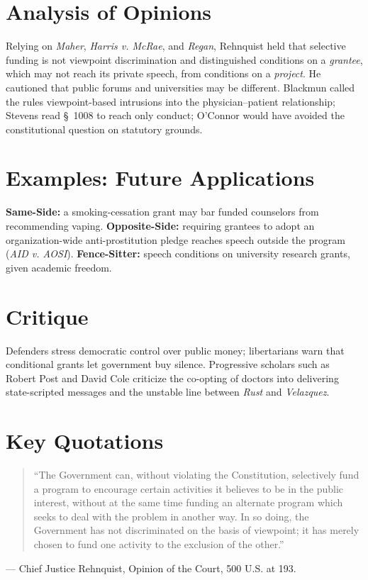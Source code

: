\documentclass[12pt]{article}
\begin{document}
\section{Analysis of Opinions}
Relying on \textit{Maher}, \textit{Harris v. McRae}, and \textit{Regan}, Rehnquist held that selective funding is not viewpoint discrimination and distinguished conditions on a \textit{grantee}, which may not reach its private speech, from conditions on a \textit{project}. He cautioned that public forums and universities may be different. Blackmun called the rules viewpoint-based intrusions into the physician--patient relationship; Stevens read \S~1008 to reach only conduct; O'Connor would have avoided the constitutional question on statutory grounds.

\section{Examples: Future Applications}
\textbf{Same-Side:} a smoking-cessation grant may bar funded counselors from recommending vaping. \textbf{Opposite-Side:} requiring grantees to adopt an organization-wide anti-prostitution pledge reaches speech outside the program (\textit{AID v. AOSI}). \textbf{Fence-Sitter:} speech conditions on university research grants, given academic freedom.

\section{Critique}
Defenders stress democratic control over public money; libertarians warn that conditional grants let government buy silence. Progressive scholars such as Robert Post and David Cole criticize the co-opting of doctors into delivering state-scripted messages and the unstable line between \textit{Rust} and \textit{Velazquez}.

\section{Key Quotations}
\begin{quote}
``The Government can, without violating the Constitution, selectively fund a program to encourage certain activities it believes to be in the public interest, without at the same time funding an alternate program which seeks to deal with the problem in another way. In so doing, the Government has not discriminated on the basis of viewpoint; it has merely chosen to fund one activity to the exclusion of the other.''
\end{quote}
\noindent --- Chief Justice Rehnquist, Opinion of the Court, 500 U.S. at 193.
\end{document}

